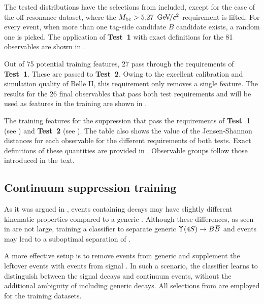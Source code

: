The tested distributions have the selections from  included, except for the case of the off-resonance dataset, where the ${M_{\mathrm{bc}}}>5.27~{\mathrm{\,Ge\kern -0.1em V\!/}c^2}$ requirement is lifted.
For every event, when more than one tag-side candidate $B$ candidate exists, a random one is picked.
The application of \textbf{Test~1} with exact definitions for the 81 observables are shown in .

Out of 75 potential training features, 27 pass through the requirements of \textbf{Test~1}.
These are passed to \textbf{Test~2}.
Owing to the excellent calibration and simulation quality of Belle II, this requirement only removes a single feature.
The results for the 26 final observables that pass both test requirements and will be used as features in the \BDT training
are shown in .

\begin{table}[htbp!]
    \centering
    \caption{\label{tab:passing_test1}The training features for the \epem\ra\qqbar suppression
    that pass the requirements of \textbf{Test~1} (see ) and \textbf{Test~2} (see ).
    The table also shows the value of the Jensen-Shannon distances for each observable for the different requirements of both tests.
    Exact definitions of these quantities are provided in .
    Observable groups follow those introduced in the text.
    }   
    
\end{table}

\subsection{Continuum suppression training}\label{sec:continuum_training}

As it was argued in , events containing \BtoXsgamma decays may have slightly different kinematic properties compared to a generic-\BB.
Although these differences, as seen in  are not large, training a classifier to separate generic $\FourS\ra\BB$ and \epem\ra\qqbar events may lead to a suboptimal separation of \BtoXsgamma.

A more effective setup is to remove \BB events from generic \MC and supplement the leftover events with \BtoXsgamma events from signal \MC. 
In such a scenario, the classifier learns to distinguish between the signal decays and continuum events, without the additional ambiguity of including generic \BB decays.
All selections from  are employed for the training datasets.

